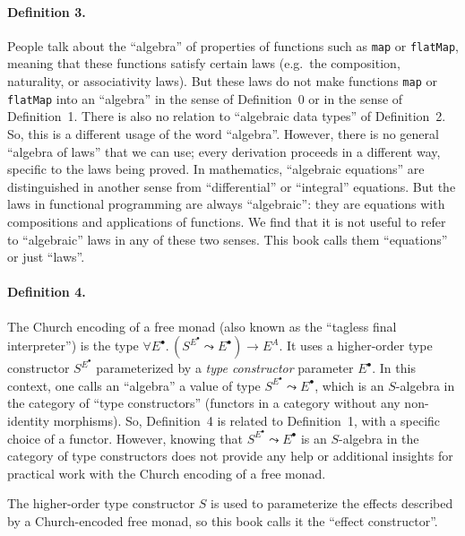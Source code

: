 \paragraph{Definition 3.}

People talk about the \textquotedblleft algebra\textquotedblright{}
of properties of functions such as \lstinline!map! or \lstinline!flatMap!,
meaning that these functions satisfy certain laws (e.g.~the composition,
naturality, or associativity laws). But these laws do not make functions
\lstinline!map! or \lstinline!flatMap! into an ``algebra'' in
the sense of Definition~0 or in the sense of Definition~1. There
is also no relation to \textquotedblleft algebraic data types\textquotedblright{}
of Definition~2. So, this is a different usage of the word ``algebra''.
However, there is no general ``algebra of laws'' that we can use;
every derivation proceeds in a different way, specific to the laws
being proved. In mathematics, ``algebraic equations'' are distinguished
in another sense from ``differential'' or ``integral'' equations.
But the laws in functional programming are always ``algebraic'':
they are equations with compositions and applications of functions.
We find that it is not useful to refer to ``algebraic'' laws in
any of these two senses. This book calls them ``equations'' or just
``laws''.

\paragraph{Definition 4.}

The Church encoding of a free monad (also known as the ``tagless
final interpreter'') is the type $\forall E^{\bullet}.\,(S^{E^{\bullet}}\leadsto E^{\bullet})\rightarrow E^{A}$.
It uses a higher-order type constructor $S^{E^{\bullet}}$ parameterized
by a \emph{type constructor} parameter $E^{\bullet}$. In this context,
one calls an ``algebra'' a value of type $S^{E^{\bullet}}\leadsto E^{\bullet}$,
which is an $S$-algebra in the category of ``type constructors''
(functors in a category without any non-identity morphisms). So, Definition~4
is related to Definition~1, with a specific choice of a functor.
However, knowing that $S^{E^{\bullet}}\leadsto E^{\bullet}$ is an
$S$-algebra in the category of type constructors does not provide
any help or additional insights for practical work with the Church
encoding of a free monad.

The higher-order type constructor $S$ is used to parameterize the
effects described by a Church-encoded free monad, so this book calls
it the ``effect constructor''.

